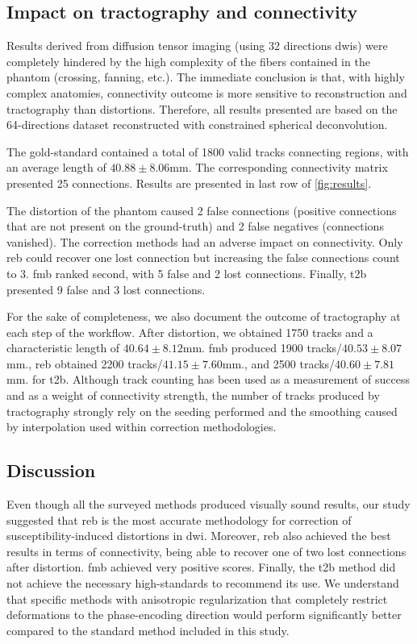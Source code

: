\subsection{Impact on tractography and connectivity}

Results derived from diffusion tensor imaging 
(using 32 directions \glspl*{dwi})
were completely hindered by the high complexity of the
fibers contained in the phantom (crossing, fanning, etc.).
The immediate conclusion is that, with highly complex anatomies,
connectivity outcome is more sensitive to 
reconstruction and tractography than distortions. Therefore,
all results presented are based on the 64-directions dataset
reconstructed with constrained spherical deconvolution.

The gold-standard contained a total of 1800 valid tracks
connecting regions, with an average length of $40.88\pm8.06$mm.
The corresponding connectivity matrix presented 25 connections.
Results are presented in last row of \autoref{fig:results}.

The distortion of the phantom caused 2 false connections 
(positive connections that are not present on the ground-truth) 
and 2 false negatives (connections vanished).
The correction methods had an adverse impact
on connectivity. Only \gls*{reb} could recover one lost connection
but increasing the false connections count to 3.
\gls*{fmb} ranked second, with 5 false and 2 lost connections.
Finally, \gls*{t2b} presented 9 false and 3 lost connections.

For the sake of completeness, we also document the outcome
of tractography at each step of the workflow. After distortion,
we obtained 1750 tracks and a characteristic length of 
$40.64\pm8.12$mm.
\gls*{fmb} produced 1900 tracks/$40.53\pm8.07$mm., \gls*{reb}
obtained 2200 tracks/$41.15\pm7.60$mm., and 2500 
tracks/$40.60\pm7.81$mm. for \gls*{t2b}. Although track counting has
been used as a measurement of success and as a weight of connectivity 
strength, the number of tracks produced by tractography strongly rely
on the seeding performed and the smoothing caused by interpolation used
within correction methodologies.

\subsection{Discussion}

Even though all the surveyed methods produced visually 
sound results, our study suggested that \gls*{reb} is the 
most accurate methodology for correction of susceptibility-induced
distortions in \gls*{dwi}. Moreover, \gls*{reb} also achieved
the best results in terms of connectivity, being able to recover
one of two lost connections after distortion. \Gls*{fmb} achieved 
very positive scores. Finally, the \gls*{t2b} method did not achieve
the necessary high-standards to recommend its use. We understand
that specific methods with anisotropic regularization that completely
restrict deformations to the phase-encoding direction would perform
significantly better compared to the standard method included
in this study.

